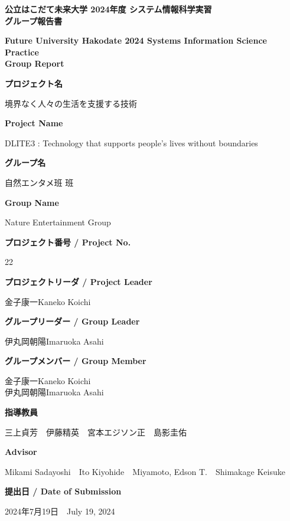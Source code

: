\documentclass[11pt,a4paper]{report}
\newcommand{\AgendaBox}[2]{
    \large
    \textbf{#1}\\

    \vspace{0.2cm}

    \small 
    #2

    \vspace{0.5cm}
}
\newcommand{\NameBox}[2]{
    \small 
    #1\hspace{1cm}#2
}
\begin{document}
\thispagestyle{empty}
\begin{center}
    \large
    \textbf{
      公立はこだて未来大学 2024年度 システム情報科学実習\\
      グループ報告書
    }\\

    \vspace{0.2cm}

    \small 
    \textbf{
      Future University Hakodate 2024 Systems Information Science Practice\\Group Report
    }

    \vspace{0.5cm}

    \AgendaBox{プロジェクト名}{境界なく人々の生活を支援する技術}
    \AgendaBox{Project Name}{DLITE3 : Technology that supports people's lives without boundaries}
    \AgendaBox{グループ名}{自然エンタメ班 班}
    \AgendaBox{Group Name}{Nature Entertainment Group}
    \AgendaBox{プロジェクト番号 / Project No.}{22}
    \AgendaBox{プロジェクトリーダ / Project Leader}{金子康一\hspace{1cm}Kaneko Koichi}
    \AgendaBox{グループリーダー / Group Leader}{
      \NameBox{伊丸岡朝陽}{Imaruoka Asahi}\\
    }
    \AgendaBox{グループメンバー / Group Member}{
      \NameBox{金子康一}{Kaneko Koichi}\\
      \NameBox{伊丸岡朝陽}{Imaruoka Asahi}\\
    }
    \AgendaBox{指導教員}{
      三上貞芳　伊藤精英　宮本エジソン正　島影圭佑
    }
    \AgendaBox{Advisor}{
      Mikami Sadayoshi　Ito Kiyohide　Miyamoto, Edson T.　Shimakage Keisuke
    }
    \AgendaBox{提出日 / Date of Submission}{
      2024年7月19日　July 19, 2024
    }
    

\end{center}

\newpage
\thispagestyle{empty}
\mbox{}
\newpage

\clearpage
{}
\setcounter{page}{1}
\end{document}
